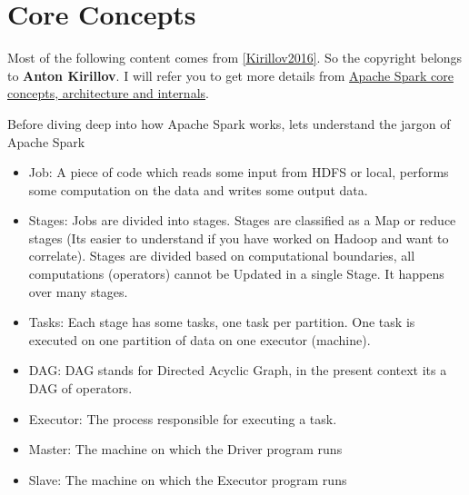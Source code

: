 \documentclass[letterpaper,11pt,english]{sphinxmanual}
\begin{document}
\section{Core Concepts}
\label{introduction:core-concepts}
Most of the following content comes from {\hyperref[reference:kirillov2016]{{[}Kirillov2016{]}}}. So the copyright belongs to \textbf{Anton Kirillov}.
I will refer you to get more details from \href{http://datastrophic.io/core-concepts-architecture-and-internals-of-apache-spark/}{Apache Spark core concepts, architecture and internals}.

Before diving deep into how Apache Spark works, lets understand the jargon of Apache Spark
\begin{itemize}
\item {} 
Job: A piece of code which reads some input from HDFS or local, performs some computation on the data and writes some output data.

\item {} 
Stages: Jobs are divided into stages. Stages are classified as a Map or reduce stages (Its easier to understand if you have worked on Hadoop and want to correlate). Stages are divided based on computational boundaries, all computations (operators) cannot be Updated in a single Stage. It happens over many stages.

\item {} 
Tasks: Each stage has some tasks, one task per partition. One task is executed on one partition of data on one executor (machine).

\item {} 
DAG: DAG stands for Directed Acyclic Graph, in the present context its a DAG of operators.

\item {} 
Executor: The process responsible for executing a task.

\item {} 
Master: The machine on which the Driver program runs

\item {} 
Slave: The machine on which the Executor program runs

\end{itemize}
\end{document}
